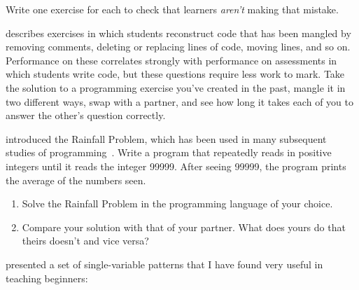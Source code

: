 \noindent
Write one exercise for each to check that learners \emph{aren't} making that mistake.


\cite{Chen2017} describes exercises in which students reconstruct code that has been mangled
by removing comments,
deleting or replacing lines of code,
moving lines,
and so on.
Performance on these correlates strongly with performance on assessments
in which students write code,
but these questions require less work to mark.
Take the solution to a programming exercise you've created in the past,
mangle it in two different ways,
swap with a partner,
and see how long it takes each of you to answer the other's question correctly.


\cite{Solo1986} introduced the Rainfall Problem,
which has been used in many subsequent studies of programming~\cite{Fisl2014,Simo2013,Sepp2015}.
Write a program that repeatedly reads in positive integers until it reads the integer 99999.
After seeing 99999,
the program prints the average of the numbers seen.

\begin{enumerate}

\item
  Solve the Rainfall Problem in the programming language of your choice.

\item
  Compare your solution with that of your partner.
  What does yours do that theirs doesn't and vice versa?

\end{enumerate}


\cite{Kuit2004,Byck2005,Saja2006} presented a set of single-variable patterns
that I have found very useful in teaching beginners:

